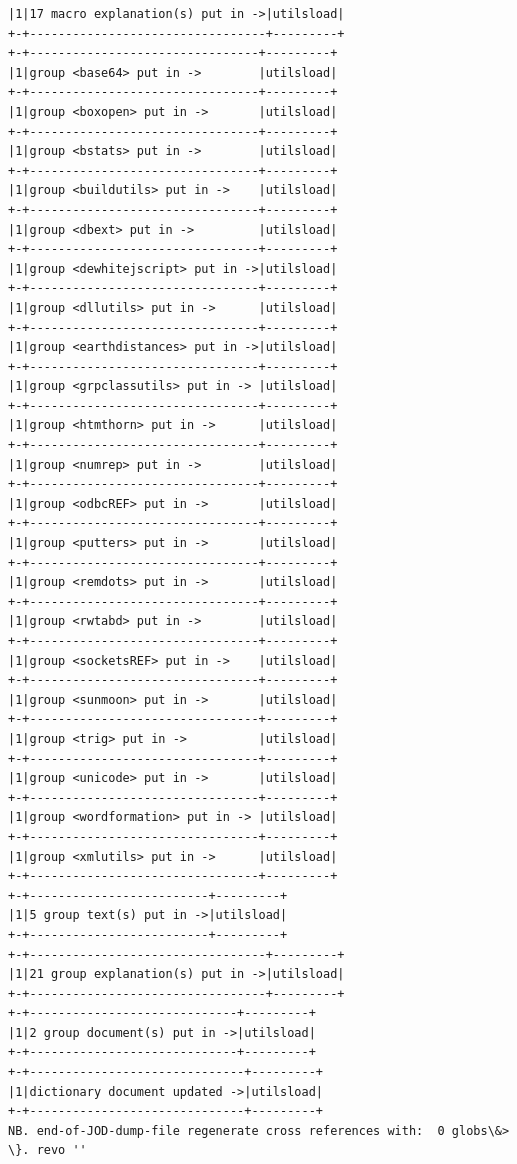 \documentclass[11pt,letter,landscape]{article}
\begin{document}
\begin{Verbatim}[commandchars=\\\{\}]
|1|17 macro explanation(s) put in ->|utilsload|
+-+---------------------------------+---------+
+-+--------------------------------+---------+
|1|group <base64> put in ->        |utilsload|
+-+--------------------------------+---------+
|1|group <boxopen> put in ->       |utilsload|
+-+--------------------------------+---------+
|1|group <bstats> put in ->        |utilsload|
+-+--------------------------------+---------+
|1|group <buildutils> put in ->    |utilsload|
+-+--------------------------------+---------+
|1|group <dbext> put in ->         |utilsload|
+-+--------------------------------+---------+
|1|group <dewhitejscript> put in ->|utilsload|
+-+--------------------------------+---------+
|1|group <dllutils> put in ->      |utilsload|
+-+--------------------------------+---------+
|1|group <earthdistances> put in ->|utilsload|
+-+--------------------------------+---------+
|1|group <grpclassutils> put in -> |utilsload|
+-+--------------------------------+---------+
|1|group <htmthorn> put in ->      |utilsload|
+-+--------------------------------+---------+
|1|group <numrep> put in ->        |utilsload|
+-+--------------------------------+---------+
|1|group <odbcREF> put in ->       |utilsload|
+-+--------------------------------+---------+
|1|group <putters> put in ->       |utilsload|
+-+--------------------------------+---------+
|1|group <remdots> put in ->       |utilsload|
+-+--------------------------------+---------+
|1|group <rwtabd> put in ->        |utilsload|
+-+--------------------------------+---------+
|1|group <socketsREF> put in ->    |utilsload|
+-+--------------------------------+---------+
|1|group <sunmoon> put in ->       |utilsload|
+-+--------------------------------+---------+
|1|group <trig> put in ->          |utilsload|
+-+--------------------------------+---------+
|1|group <unicode> put in ->       |utilsload|
+-+--------------------------------+---------+
|1|group <wordformation> put in -> |utilsload|
+-+--------------------------------+---------+
|1|group <xmlutils> put in ->      |utilsload|
+-+--------------------------------+---------+
+-+-------------------------+---------+
|1|5 group text(s) put in ->|utilsload|
+-+-------------------------+---------+
+-+---------------------------------+---------+
|1|21 group explanation(s) put in ->|utilsload|
+-+---------------------------------+---------+
+-+-----------------------------+---------+
|1|2 group document(s) put in ->|utilsload|
+-+-----------------------------+---------+
+-+------------------------------+---------+
|1|dictionary document updated ->|utilsload|
+-+------------------------------+---------+
NB. end-of-JOD-dump-file regenerate cross references with:  0 globs\&> \}. revo '' 

    \end{Verbatim}
\end{document}
